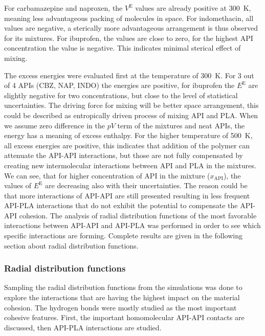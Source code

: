 \newpage
For carbamazepine and naproxen, the $V^\text{E}$ values are already positive at 300~K, meaning less advantageous packing of molecules in space. For indomethacin, all values are negative, a sterically more advantageous arrangement is thus observed for its mixtures. For ibuprofen, the values are close to zero, for the highest API concentration the value is negative. This indicates minimal sterical effect of mixing. 

The excess energies were evaluated first at the temperature of 300~K. For 3 out of 4 APIs (CBZ, NAP, INDO) the energies are positive, for ibuprofen the $E^\text{E}$ are slightly negative for two concentrations, but close to the level of statistical uncertainties. The driving force for mixing will be better space arrangement, this could be described as entropically driven process of mixing API and PLA. When we assume zero difference in the $pV$ term of the mixtures and neat APIs, the energy has a meaning of excess enthalpy. For the higher temperature of 500~K, all excess energies are positive, this indicates that addition of the polymer can attenuate the API-API interactions, but those are not fully compensated by creating new intermolecular interactions between API and PLA in the mixtures. We can see, that for higher concentration of API in the mixture ($x_{\text{API}}$), the values of $E^\text{E}$ are decreasing also with their uncertainties. The reason could be that more interactions of API-API are still presented resulting in less frequent API-PLA interactions that do not exhibit the potential to compensate the API-API cohesion. The analysis of radial distribution functions of the most favorable interactions between API-API and API-PLA was performed in order to see which specific interactions are forming. Complete results are given in the following section about radial distribution functions.





\newpage
\subsubsection{Radial distribution functions}

Sampling the radial distribution functions from the simulations was done to explore the interactions that are having the highest impact on the material cohesion. The hydrogen bonds were mostly studied as the most important cohesive features. First, the important homomolecular API-API contacts are discussed, then API-PLA interactions are studied.



